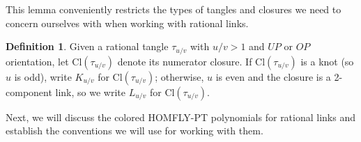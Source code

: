 \documentclass[11pt]{amsart}
\theoremstyle{plain}
\theoremstyle{definition}
\newtheorem{definitionN}[theoremN]{Definition}
\theoremstyle{remark}
\begin{document}
This lemma conveniently restricts the types of tangles and closures we need to concern ourselves with when working with rational links.

\begin{definitionN}
    Given a rational tangle $\tau_{u/v}$ with $u/v>1$ and $UP$ or $OP$ orientation, let $\text{Cl}(\tau_{u/v})$ denote its numerator closure. If $\text{Cl}(\tau_{u/v})$ is a knot (so $u$ is odd), write $K_{u/v}$ for $\text{Cl}(\tau_{u/v})$; otherwise, $u$ is even and the closure is a 2-component link, so we write $L_{u/v}$ for $\text{Cl}(\tau_{u/v})$.
\end{definitionN}

Next, we will discuss the colored HOMFLY-PT polynomials for rational links and establish the conventions we will use for working with them.
\end{document}
